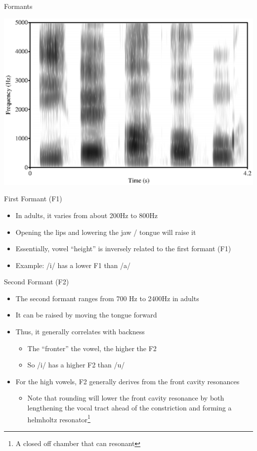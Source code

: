 \documentclass[professionalfonts]{beamer}
\begin{document}
\begin{frame}{Formants}
    \begin{center}
        \includegraphics[width=\linewidth]{figs/mlb_ieaou.eps}
    \end{center}
\end{frame}

\begin{frame}{First Formant (F1)}
    \begin{itemize}
        \item In adults, it varies from about 200Hz to 800Hz
        \item Opening the lips and lowering the jaw / tongue will raise it
        \item Essentially, vowel “height” is inversely related to the first formant (F1)
        \item Example: /i/ has a lower F1 than /a/
    \end{itemize}
\end{frame}

\begin{frame}{Second Formant (F2)}
    \begin{itemize}
        \item The second formant ranges from 700 Hz to 2400Hz in adults
        \item It can be raised by moving the tongue forward
        \item Thus, it generally correlates with backness
        \begin{itemize}
            \item The “fronter” the vowel, the higher the F2
            \item So /i/ has a higher F2 than /u/
        \end{itemize}
        \item For the high vowels, F2 generally derives from the front cavity resonances
        \begin{itemize}
            \item Note that rounding will lower the front cavity resonance by both lengthening the vocal tract ahead of the constriction and forming a helmholtz resonator\footnote{A closed off chamber that can resonant}
        \end{itemize} 
    \end{itemize}
\end{frame}
\end{document}
